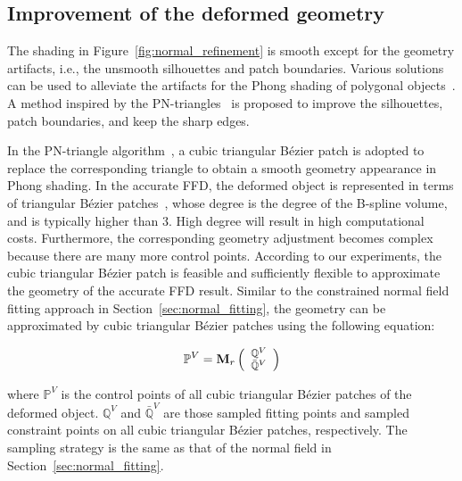 \documentclass[3p]{elsarticle}
\begin{document}

\subsection{Improvement of the deformed geometry}
\label{sec:geometry_fitting}

The shading in Figure~\ref{fig:normal_refinement} is smooth except for the geometry artifacts, i.e., the unsmooth
silhouettes and patch boundaries. Various solutions can be used to alleviate the artifacts for the Phong shading of
polygonal objects~\cite{Vlachos01, Boubekeur08}. A method inspired by the PN-triangles~\cite{Vlachos01} is proposed to
improve the silhouettes, patch boundaries, and keep the sharp edges.

In the PN-triangle algorithm~\cite{Vlachos01}, a cubic triangular B\'ezier patch is adopted to replace the corresponding
triangle to obtain a smooth geometry appearance in Phong shading. In the accurate FFD, the deformed object is
represented in terms of triangular B\'ezier patches~\cite{Feng98, Feng00, Cui14}, whose degree is the degree of the
B-spline volume, and is typically higher than 3. High degree will result in high computational costs. Furthermore, the
corresponding geometry adjustment becomes complex because there are many more control points. According to our
experiments, the cubic triangular B\'ezier patch is feasible and sufficiently flexible to approximate the geometry of
the accurate FFD result. Similar to the constrained normal field fitting approach in Section~\ref{sec:normal_fitting},
the geometry can be approximated by cubic triangular B\'ezier patches using the following equation:

\begin{equation}
	\footnotesize
	\mathbb P^V = \mathbf M_r
	\left(
		\begin{array}{c}
			\mathbb Q^V\\
			\mathbb {\bar Q}^V
		\end{array}
	\right)
	\label{equ:ctrl_points_solution_v}
\end{equation}

\noindent where $\mathbb P^V$ is the control points of all cubic triangular B\'ezier patches of the deformed object.
$\mathbb Q^V$ and $\mathbb {\bar Q}^V$ are those sampled fitting points and sampled constraint points on all cubic
triangular B\'ezier patches, respectively. The sampling strategy is the same as that of the normal field in
Section~\ref{sec:normal_fitting}.
\end{document}
